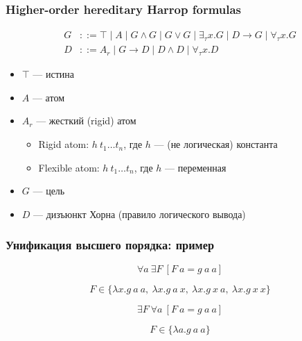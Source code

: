 \documentclass{beamer}
\begin{document}
\begin{frame}[fragile]
  \frametitle{Higher-order hereditary Harrop formulas}

  \begin{align*}
    G &::= \top \mid A \mid G \wedge G \mid G \vee G \mid \exists_{\tau} x. G \mid D \to G \mid \forall_{\tau} x. G \\
    D &::= A_r \mid G \to D \mid D \wedge D \mid \forall_{\tau} x. D
  \end{align*}

  \vspace{0.5cm}

  \begin{itemize}
    \item $\top$ --- истина
    \item $A$ --- атом
    \item $A_r$ --- жесткий (rigid) атом
    \begin{itemize}
      \item Rigid atom: $h \ t_1 \dots t_n$, где $h$ --- (не логическая) константа
      \item Flexible atom: $h \ t_1 \dots t_n$, где $h$ --- переменная
    \end{itemize}
    \item $G$ --- цель
    \item $D$ --- дизъюнкт Хорна (правило логического вывода)
  \end{itemize}
\end{frame}

\begin{frame}[fragile]
  \frametitle{Унификация высшего порядка: пример}

  \[
    \forall a \ \exists F \ [F \ a = g \ a \ a]
  \]


  \[
    F \in \{ \lambda x. g \ a \ a, \ \lambda x. g \ a \ x, \ \lambda x. g \ x \ a, \ \lambda x. g \ x \ x\}
  \]

  \pause

  \vspace{2cm}

  \[
    \exists F \ \forall a \ [F \ a = g \ a \ a]
  \]


  \[
    F \in \{ \lambda a. g \ a \ a \}
  \]
\end{frame}
\end{document}
